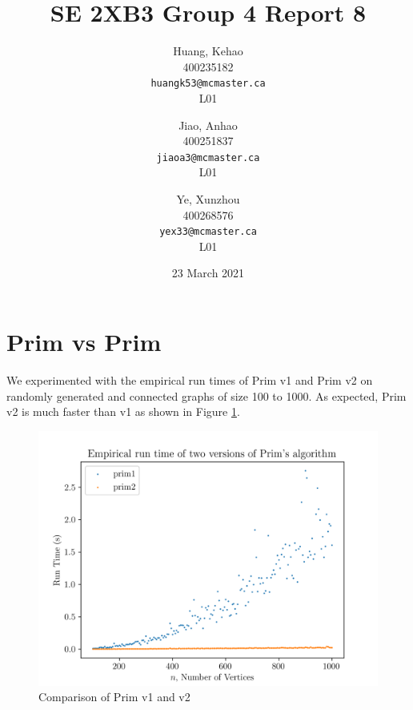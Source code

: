 \documentclass[titlepage, 12pt]{article}
\title{SE 2XB3 Group 4 Report 8}
\author{
  Huang, Kehao \\
  400235182 \\
  \texttt{huangk53@mcmaster.ca} \\
  L01
  \and
  Jiao, Anhao \\
  400251837 \\
  \texttt{jiaoa3@mcmaster.ca} \\
  L01
  \and
  Ye, Xunzhou \\
  400268576 \\
  \texttt{yex33@mcmaster.ca} \\
  L01
}
\date{23 March 2021}
\begin{document}
\maketitle{}

\newpage{}

\section{Prim vs Prim}

We experimented with the empirical run times of Prim v1 and Prim v2 on randomly
generated and connected graphs of size 100 to 1000. As expected, Prim v2 is much
faster than v1 as shown in Figure \ref{fig:comp}.
\begin{figure}[h]
  \centering
  \includegraphics[width=0.8\linewidth]{comp} 
  \caption{Comparison of Prim v1 and v2}
  \label{fig:comp}
\end{figure}
\end{document}
